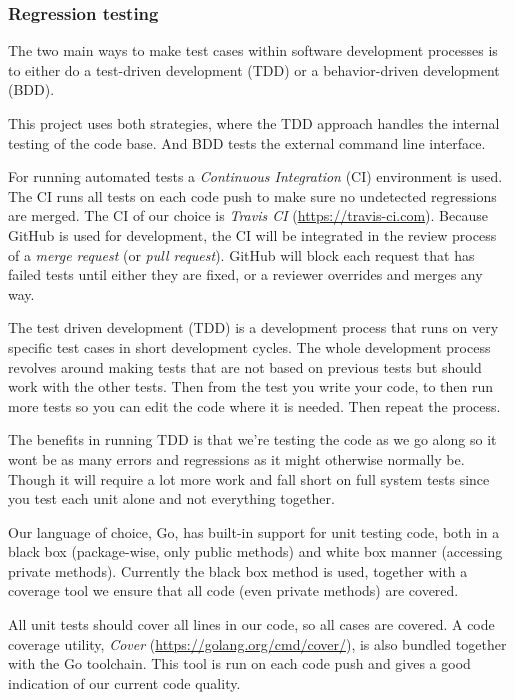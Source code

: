 \documentclass[a4paper,15pt,twoside]{article}
\begin{document}
\subsubsection{Regression testing}
The two main ways to make test cases within software development processes is to either do a test-driven development (TDD) or a behavior-driven development (BDD).

This project uses both strategies, where the TDD approach handles the internal testing of the code base. And BDD tests the external command line interface.

For running automated tests a \emph{Continuous Integration} (CI) environment is used. The CI runs all tests on each code push to make sure no undetected regressions are merged. The CI of our choice is \emph{Travis CI} (\url{https://travis-ci.com}). Because GitHub is used for development, the CI will be integrated in the review process of a \emph{merge request} (or \emph{pull request}). GitHub will block each request that has failed tests until either they are fixed, or a reviewer overrides and merges any way.

The test driven development (TDD) is a development process that runs on very specific test cases in short development cycles. The whole development process revolves around making tests that are not based on previous tests but should work with the other tests. Then from the test you write your code, to then run more tests so you can edit the code where it is needed. Then repeat the process.

The benefits in running TDD is that we're testing the code as we go along so it wont be as many errors and regressions as it might otherwise normally be. Though it will require a lot more work and fall short on full system tests since you test each unit alone and not everything together.

Our language of choice, Go, has built-in support for unit testing code, both in a black box (package-wise, only public methods) and white box manner (accessing private methods). Currently the black box method is used, together with a coverage tool we ensure that all code (even private methods) are covered.

All unit tests should cover all lines in our code, so all cases are covered. A code coverage utility, \emph{Cover} (\url{https://golang.org/cmd/cover/}), is also bundled together with the Go toolchain. This tool is run on each code push and gives a good indication of our current code quality.
\end{document}

